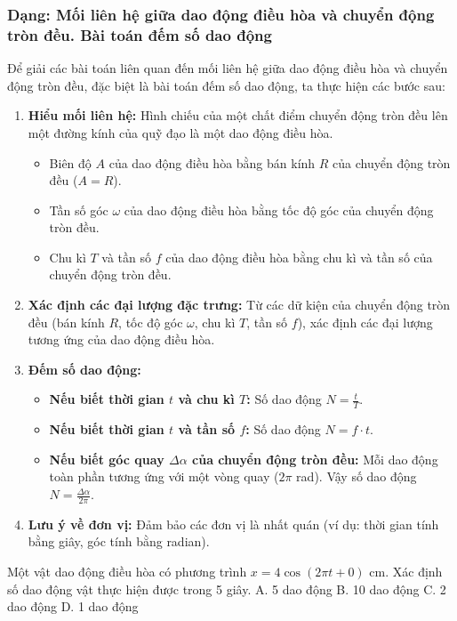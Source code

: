 \subsubsection{Dạng: Mối liên hệ giữa dao động điều hòa và chuyển động tròn đều. Bài toán đếm số dao động}
\begin{phuongphap}
Để giải các bài toán liên quan đến mối liên hệ giữa dao động điều hòa và chuyển động tròn đều, đặc biệt là bài toán đếm số dao động, ta thực hiện các bước sau:
\begin{enumerate}
    \item \textbf{Hiểu mối liên hệ:} Hình chiếu của một chất điểm chuyển động tròn đều lên một đường kính của quỹ đạo là một dao động điều hòa.
    \begin{itemize}
        \item Biên độ $A$ của dao động điều hòa bằng bán kính $R$ của chuyển động tròn đều ($A=R$).
        \item Tần số góc $\omega$ của dao động điều hòa bằng tốc độ góc của chuyển động tròn đều.
        \item Chu kì $T$ và tần số $f$ của dao động điều hòa bằng chu kì và tần số của chuyển động tròn đều.
    \end{itemize}
    \item \textbf{Xác định các đại lượng đặc trưng:} Từ các dữ kiện của chuyển động tròn đều (bán kính $R$, tốc độ góc $\omega$, chu kì $T$, tần số $f$), xác định các đại lượng tương ứng của dao động điều hòa.
    \item \textbf{Đếm số dao động:}
    \begin{itemize}
        \item \textbf{Nếu biết thời gian $t$ và chu kì $T$:} Số dao động $N = \frac{t}{T}$.
        \item \textbf{Nếu biết thời gian $t$ và tần số $f$:} Số dao động $N = f \cdot t$.
        \item \textbf{Nếu biết góc quay $\Delta\alpha$ của chuyển động tròn đều:} Mỗi dao động toàn phần tương ứng với một vòng quay ($2\pi$ rad). Vậy số dao động $N = \frac{\Delta\alpha}{2\pi}$.
    \end{itemize}
    \item \textbf{Lưu ý về đơn vị:} Đảm bảo các đơn vị là nhất quán (ví dụ: thời gian tính bằng giây, góc tính bằng radian).
\end{enumerate}
\end{phuongphap}
\begin{vidumau}
Một vật dao động điều hòa có phương trình $x=4\cos(2\pi t+0)$ cm. Xác định số dao động vật thực hiện được trong 5 giây.
\choice
A. 5 dao động
B. 10 dao động
C. 2 dao động
D. 1 dao động
\end{vidumau}

